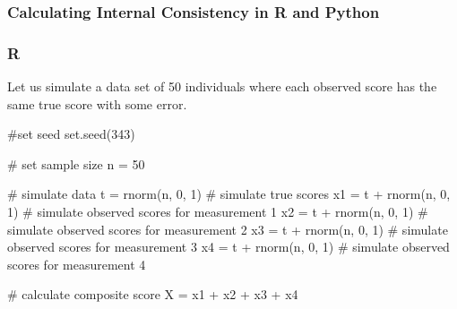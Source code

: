 \documentclass[
  letterpaper,
  DIV=11,
  numbers=noendperiod]{scrreprt}
\newenvironment{Shaded}{\begin{snugshade}}{\end{snugshade}}
\newcommand{\CommentTok}[1]{\textcolor[rgb]{0.37,0.37,0.37}{#1}}
\newcommand{\DecValTok}[1]{\textcolor[rgb]{0.68,0.00,0.00}{#1}}
\newcommand{\FunctionTok}[1]{\textcolor[rgb]{0.28,0.35,0.67}{#1}}
\newcommand{\NormalTok}[1]{\textcolor[rgb]{0.00,0.23,0.31}{#1}}
\newcommand{\OtherTok}[1]{\textcolor[rgb]{0.00,0.23,0.31}{#1}}
\newcommand{\SpecialCharTok}[1]{\textcolor[rgb]{0.37,0.37,0.37}{#1}}
\begin{document}
\hypertarget{calculating-internal-consistency-in-r-and-python}{%
\subsubsection*{Calculating Internal Consistency in R and
Python}\label{calculating-internal-consistency-in-r-and-python}}

\subsubsection{R}

Let us simulate a data set of 50 individuals where each observed score
has the same true score with some error.

\begin{Shaded}
\begin{Highlighting}[]
\CommentTok{\#set seed}
\FunctionTok{set.seed}\NormalTok{(}\DecValTok{343}\NormalTok{)}

\CommentTok{\# set sample size}
\NormalTok{n }\OtherTok{=} \DecValTok{50}

\CommentTok{\# simulate data}
\NormalTok{t }\OtherTok{=} \FunctionTok{rnorm}\NormalTok{(n, }\DecValTok{0}\NormalTok{, }\DecValTok{1}\NormalTok{) }\CommentTok{\# simulate true scores}
\NormalTok{x1 }\OtherTok{=}\NormalTok{ t }\SpecialCharTok{+} \FunctionTok{rnorm}\NormalTok{(n, }\DecValTok{0}\NormalTok{, }\DecValTok{1}\NormalTok{) }\CommentTok{\# simulate observed scores for measurement 1}
\NormalTok{x2 }\OtherTok{=}\NormalTok{ t }\SpecialCharTok{+} \FunctionTok{rnorm}\NormalTok{(n, }\DecValTok{0}\NormalTok{, }\DecValTok{1}\NormalTok{) }\CommentTok{\# simulate observed scores for measurement 2}
\NormalTok{x3 }\OtherTok{=}\NormalTok{ t }\SpecialCharTok{+} \FunctionTok{rnorm}\NormalTok{(n, }\DecValTok{0}\NormalTok{, }\DecValTok{1}\NormalTok{) }\CommentTok{\# simulate observed scores for measurement 3}
\NormalTok{x4 }\OtherTok{=}\NormalTok{ t }\SpecialCharTok{+} \FunctionTok{rnorm}\NormalTok{(n, }\DecValTok{0}\NormalTok{, }\DecValTok{1}\NormalTok{) }\CommentTok{\# simulate observed scores for measurement 4}

\CommentTok{\# calculate composite score}
\NormalTok{X }\OtherTok{=}\NormalTok{ x1 }\SpecialCharTok{+}\NormalTok{ x2 }\SpecialCharTok{+}\NormalTok{ x3 }\SpecialCharTok{+}\NormalTok{ x4}
\end{Highlighting}
\end{Shaded}
\end{document}
